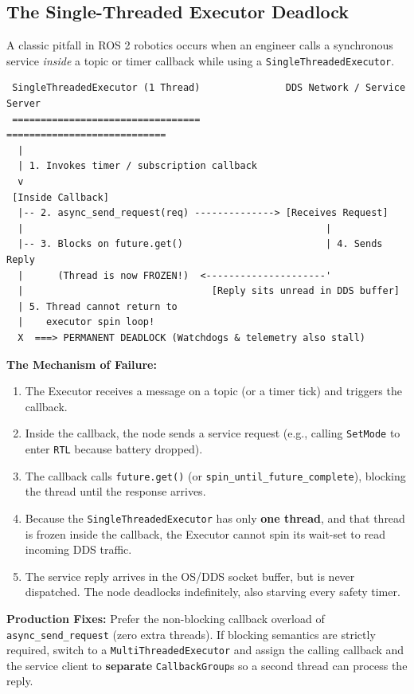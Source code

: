\documentclass{article}
\begin{document}
\subsection{The Single-Threaded Executor Deadlock}
A classic pitfall in ROS 2 robotics occurs when an engineer calls a synchronous service \textit{inside} a topic or timer callback while using a \texttt{SingleThreadedExecutor}.

\begin{verbatim}
 SingleThreadedExecutor (1 Thread)               DDS Network / Service Server
 =================================               ============================
  |
  | 1. Invokes timer / subscription callback
  v
 [Inside Callback]
  |-- 2. async_send_request(req) --------------> [Receives Request]
  |                                                     |
  |-- 3. Blocks on future.get()                         | 4. Sends Reply
  |      (Thread is now FROZEN!)  <---------------------'
  |                                 [Reply sits unread in DDS buffer]
  | 5. Thread cannot return to
  |    executor spin loop!
  X  ===> PERMANENT DEADLOCK (Watchdogs & telemetry also stall)
\end{verbatim}

\textbf{The Mechanism of Failure:}
\begin{enumerate}
    \item The Executor receives a message on a topic (or a timer tick) and triggers the callback.
    \item Inside the callback, the node sends a service request (e.g., calling \texttt{SetMode} to enter \texttt{RTL} because battery dropped).
    \item The callback calls \texttt{future.get()} (or \texttt{spin\_until\_future\_complete}), blocking the thread until the response arrives.
    \item Because the \texttt{SingleThreadedExecutor} has only \textbf{one thread}, and that thread is frozen inside the callback, the Executor cannot spin its wait-set to read incoming DDS traffic.
    \item The service reply arrives in the OS/DDS socket buffer, but is never dispatched. The node deadlocks indefinitely, also starving every safety timer.
\end{enumerate}

\textbf{Production Fixes:} Prefer the non-blocking callback overload of \texttt{async\_send\_request} (zero extra threads). If blocking semantics are strictly required, switch to a \texttt{MultiThreadedExecutor} and assign the calling callback and the service client to \textbf{separate} \texttt{CallbackGroup}s so a second thread can process the reply.
\end{document}
